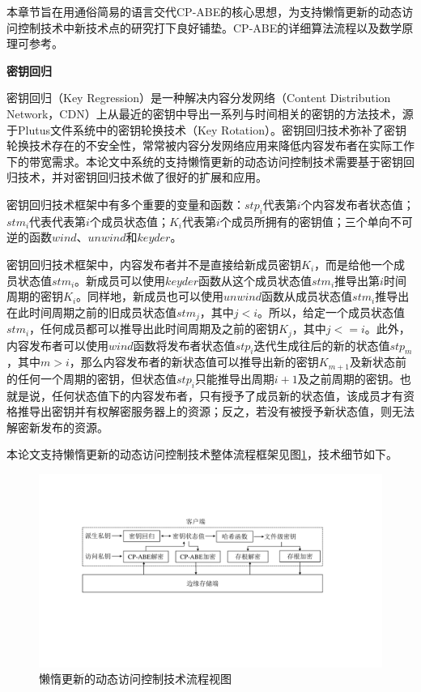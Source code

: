 \documentclass[promaster]{thesis-uestc}
\begin{document}
本章节旨在用通俗简易的语言交代CP-ABE的核心思想，为支持懒惰更新的动态访问控制技术中新技术点的研究打下良好铺垫。CP-ABE的详细算法流程以及数学原理可参考\cite{bethencourt2007ciphertext}。

\textbf{密钥回归}\label{密钥回归}

密钥回归（Key Regression）是一种解决内容分发网络（Content Distribution Network，CDN）上从最近的密钥中导出一系列与时间相关的密钥的方法技术，源于Plutus文件系统中的密钥轮换技术（Key Rotation）。密钥回归技术弥补了密钥轮换技术存在的不安全性，常常被内容分发网络应用来降低内容发布者在实际工作下的带宽需求。本论文中系统的支持懒惰更新的动态访问控制技术需要基于密钥回归技术，并对密钥回归技术做了很好的扩展和应用。

密钥回归技术框架中有多个重要的变量和函数：$stp_i$代表第$i$个内容发布者状态值；$stm_i$代表代表第$i$个成员状态值；$K_i$代表第$i$个成员所拥有的密钥值；三个单向不可逆的函数$wind$、$unwind$和$keyder$。


密钥回归技术框架中，内容发布者并不是直接给新成员密钥$K_i$，而是给他一个成员状态值$stm_i$。新成员可以使用$keyder$函数从这个成员状态值$stm_i$推导出第$i$时间周期的密钥$K_i$。同样地，新成员也可以使用$unwind$函数从成员状态值$stm_i$推导出在此时间周期之前的旧成员状态值$stm_j$，其中$j<i$。所以，给定一个成员状态值$stm_i$，任何成员都可以推导出此时间周期及之前的密钥$K_j$，其中$j<=i$。此外，内容发布者可以使用$wind$函数将发布者状态值$stp_i$迭代生成往后的新的状态值$stp_m$，其中$m>i$，那么内容发布者的新状态值可以推导出新的密钥$K_{m+1}$及新状态前的任何一个周期的密钥，但状态值$stp_i$只能推导出周期$i+1$及之前周期的密钥。也就是说，任何状态值下的内容发布者，只有授予了成员新的状态值，该成员才有资格推导出密钥并有权解密服务器上的资源；反之，若没有被授予新状态值，则无法解密新发布的资源。

本论文支持懒惰更新的动态访问控制技术整体流程框架见图\ref{懒惰更新的动态访问控制技术流程视图}，技术细节如下。

\begin{figure}[htbp]  %
    \centering
    \includegraphics[width = 1.0\linewidth]{pic/dongtaifangwenkonzhi.pdf}
    \caption{懒惰更新的动态访问控制技术流程视图}
    \label{懒惰更新的动态访问控制技术流程视图}
\end{figure}
\end{document}
